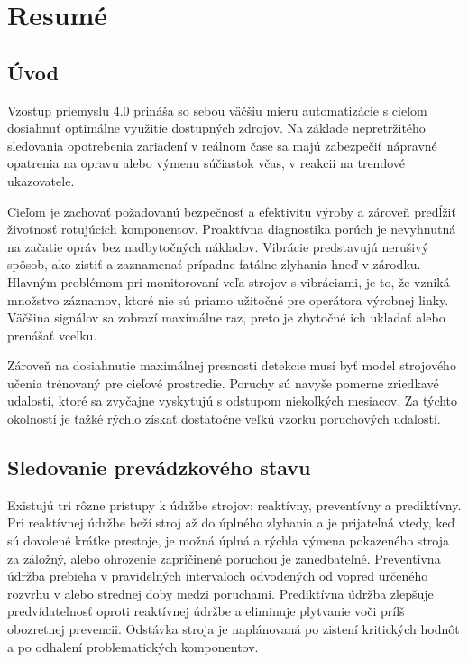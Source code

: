 \thispagestyle{empty}
\chapter{Resumé}
\renewcommand*{\thepage}{A-\arabic{page}}

\section{Úvod}
Vzostup priemyslu 4.0 prináša so sebou väčšiu mieru automatizácie s cieľom dosiahnuť optimálne využitie dostupných zdrojov. Na základe nepretržitého sledovania opotrebenia zariadení v reálnom čase sa majú zabezpečiť nápravné opatrenia na opravu alebo výmenu súčiastok včas, v reakcii na trendové ukazovatele. 

Cieľom je zachovať požadovanú bezpečnosť a efektivitu výroby a zároveň predĺžiť životnosť rotujúcich komponentov. Proaktívna diagnostika porúch je nevyhnutná na začatie opráv bez nadbytočných nákladov. Vibrácie predstavujú nerušivý spôsob, ako zistiť a zaznamenať prípadne fatálne zlyhania hneď v zárodku. Hlavným problémom pri monitorovaní veľa strojov s vibráciami, je to, že vzniká množstvo záznamov, ktoré nie sú priamo užitočné pre operátora výrobnej linky. Väčšina signálov sa zobrazí maximálne raz, preto je zbytočné ich ukladať alebo prenášať vcelku. 

Zároveň na dosiahnutie maximálnej presnosti detekcie musí byť model strojového učenia trénovaný pre cieľové prostredie. Poruchy sú navyše pomerne zriedkavé udalosti, ktoré sa zvyčajne vyskytujú s odstupom niekoľkých mesiacov. Za týchto okolností je ťažké rýchlo získať dostatočne veľkú vzorku poruchových udalostí.

\section{Sledovanie prevádzkového stavu}
Existujú tri rôzne prístupy k údržbe strojov: reaktívny, preventívny a prediktívny.
Pri reaktívnej údržbe beží stroj až do úplného zlyhania a je prijateľná vtedy, keď sú dovolené krátke prestoje, je možná úplná a rýchla výmena pokazeného stroja za záložný, alebo ohrozenie zapríčinené poruchou je zanedbateľné. Preventívna údržba prebieha v pravidelných intervaloch odvodených od vopred určeného rozvrhu v alebo strednej doby medzi poruchami. Prediktívna údržba zlepšuje predvídateľnosť oproti reaktívnej údržbe a eliminuje plytvanie voči prílš obozretnej prevencii. Odstávka stroja je naplánovaná po zistení kritických hodnôt a po odhalení problematických komponentov.

